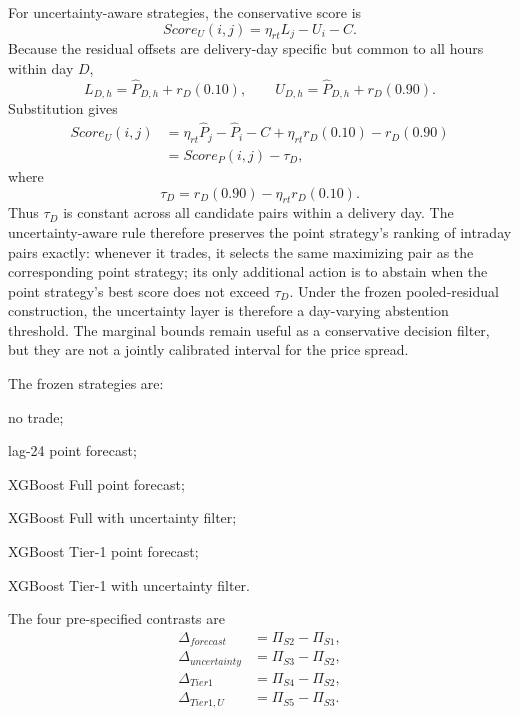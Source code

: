 For uncertainty-aware strategies, the conservative score is
\begin{equation}
Score_U(i,j)=\eta_{rt}L_j-U_i-C.
\end{equation}
Because the residual offsets are delivery-day specific but common to all hours within day \(D\),
\[
L_{D,h}=\widehat P_{D,h}+r_D(0.10),\qquad
U_{D,h}=\widehat P_{D,h}+r_D(0.90).
\]
Substitution gives
\begin{align}
Score_U(i,j)
&=\eta_{rt}\widehat P_j-\widehat P_i-C
   +\eta_{rt}r_D(0.10)-r_D(0.90)\\
&=Score_P(i,j)-\tau_D,
\end{align}
where
\begin{equation}
\tau_D=r_D(0.90)-\eta_{rt}r_D(0.10).
\end{equation}
Thus \(\tau_D\) is constant across all candidate pairs within a delivery day. The uncertainty-aware rule therefore preserves the point strategy's ranking of intraday pairs exactly: whenever it trades, it selects the same maximizing pair as the corresponding point strategy; its only additional action is to abstain when the point strategy's best score does not exceed \(\tau_D\). Under the frozen pooled-residual construction, the uncertainty layer is therefore a day-varying abstention threshold. The marginal bounds remain useful as a conservative decision filter, but they are not a jointly calibrated interval for the price spread.

The frozen strategies are:
\begin{description}[leftmargin=1.2cm,style=nextline]
\item[S0] no trade;
\item[S1] lag-24 point forecast;
\item[S2] XGBoost Full point forecast;
\item[S3] XGBoost Full with uncertainty filter;
\item[S4] XGBoost Tier-1 point forecast;
\item[S5] XGBoost Tier-1 with uncertainty filter.
\end{description}

The four pre-specified contrasts are
\begin{align}
\Delta_{forecast}&=\Pi_{S2}-\Pi_{S1},\\
\Delta_{uncertainty}&=\Pi_{S3}-\Pi_{S2},\\
\Delta_{Tier1}&=\Pi_{S4}-\Pi_{S2},\\
\Delta_{Tier1,U}&=\Pi_{S5}-\Pi_{S3}.
\end{align}

